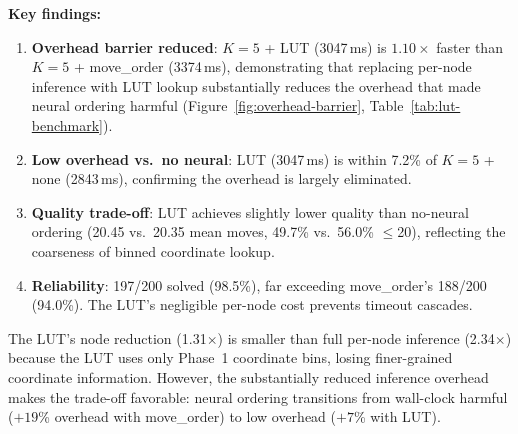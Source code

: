 \documentclass[conference]{IEEEtran}
\begin{document}
\begin{table}[htbp]
\centering
\caption{LUT benchmark: wall-clock comparison (200 scrambles, seed 42, $K{=}5$).}
\label{tab:lut-benchmark}
\end{table}

\textbf{Key findings:}
\begin{enumerate}[leftmargin=*]
  \item \textbf{Overhead barrier reduced}: $K{=}5$ + LUT (3047\,ms) is $1.10{\times}$ faster than $K{=}5$ + move\_order (3374\,ms), demonstrating that replacing per-node inference with LUT lookup substantially reduces the overhead that made neural ordering harmful (Figure~\ref{fig:overhead-barrier}, Table~\ref{tab:lut-benchmark}).
  \item \textbf{Low overhead vs.\ no neural}: LUT (3047\,ms) is within 7.2\% of $K{=}5$ + none (2843\,ms), confirming the overhead is largely eliminated.
  \item \textbf{Quality trade-off}: LUT achieves slightly lower quality than no-neural ordering (20.45 vs.\ 20.35 mean moves, 49.7\% vs.\ 56.0\% $\leq$20), reflecting the coarseness of binned coordinate lookup.
  \item \textbf{Reliability}: 197/200 solved (98.5\%), far exceeding move\_order's 188/200 (94.0\%). The LUT's negligible per-node cost prevents timeout cascades.
\end{enumerate}

The LUT's node reduction (1.31$\times$) is smaller than full per-node inference (2.34$\times$) because the LUT uses only Phase~1 coordinate bins, losing finer-grained coordinate information. However, the substantially reduced inference overhead makes the trade-off favorable: neural ordering transitions from wall-clock harmful ($+19$\% overhead with move\_order) to low overhead ($+7$\% with LUT).
\end{document}
